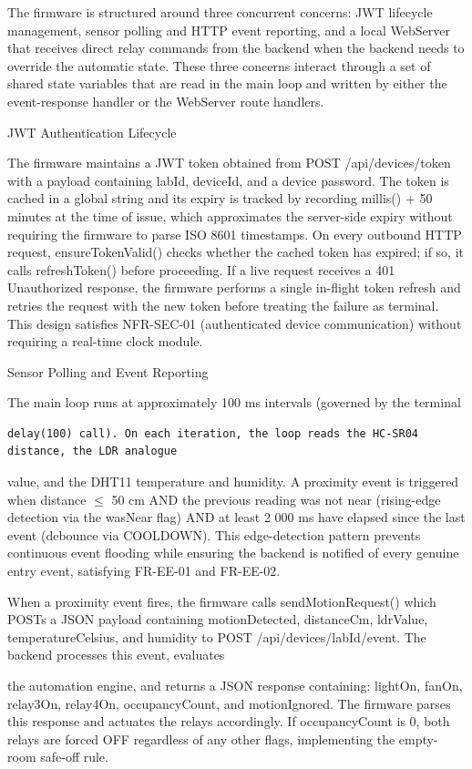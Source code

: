 The firmware is structured around three concurrent concerns: JWT lifecycle
management, sensor polling and HTTP event reporting, and a local WebServer that
receives direct relay commands from the backend when the backend needs to override
the automatic state. These three concerns interact through a set of shared state variables
that are read in the main loop and written by either the event-response handler or the
WebServer route handlers.

JWT Authentication Lifecycle

The firmware maintains a JWT token obtained from POST /api/devices/token with a
payload containing labId, deviceId, and a device password. The token is cached in a
global string and its expiry is tracked by recording millis() + 50 minutes at the time of
issue, which approximates the server-side expiry without requiring the firmware to
parse ISO 8601 timestamps. On every outbound HTTP request, ensureTokenValid()
checks whether the cached token has expired; if so, it calls refreshToken() before
proceeding. If a live request receives a 401 Unauthorized response, the firmware
performs a single in-flight token refresh and retries the request with the new token
before treating the failure as terminal. This design satisfies NFR-SEC-01 (authenticated
device communication) without requiring a real-time clock module.

Sensor Polling and Event Reporting

The main loop runs at approximately 100 ms intervals (governed by the terminal
\begin{lstlisting}
delay(100) call). On each iteration, the loop reads the HC-SR04 distance, the LDR analogue
\end{lstlisting}

value, and the DHT11 temperature and humidity. A proximity event is triggered when
distance $\le$ 50 cm AND the previous reading was not near (rising-edge detection via the
wasNear flag) AND at least 2 000 ms have elapsed since the last event (debounce via
COOLDOWN). This edge-detection pattern prevents continuous event flooding while
ensuring the backend is notified of every genuine entry event, satisfying FR-EE-01 and
FR-EE-02.

When a proximity event fires, the firmware calls sendMotionRequest() which POSTs a
JSON payload containing motionDetected, distanceCm, ldrValue, temperatureCelsius, and
humidity to POST /api/devices/{labId}/event. The backend processes this event, evaluates


the automation engine, and returns a JSON response containing: lightOn, fanOn,
relay3On, relay4On, occupancyCount, and motionIgnored. The firmware parses this
response and actuates the relays accordingly. If occupancyCount is 0, both relays are
forced OFF regardless of any other flags, implementing the empty-room safe-off rule.

